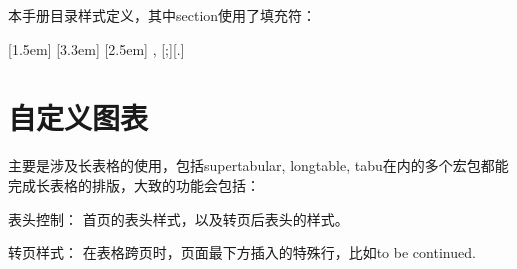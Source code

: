 本手册目录样式定义，其中section使用了填充符：
\begin{latex}{}
[1.5em]{}{\contentslabel{1.5em}}
    {\hspace*{-2em}}{\hfill\contentspage}
[3.3em]{}
    {\contentslabel{1.8em}}{\hspace*{-2.3em}}
    {\titlerule*[8pt]{$\cdot$}\contentspage}
[2.5em]{\small}
    {\thecontentslabel{}}{}
    {, \thecontentspage}[;\qquad][.]
\end{latex}

\section{自定义图表}
\label{sec:figtab}
主要是涉及长表格的使用，包括supertabular, longtable, tabu在内的多个宏包都能完成长表格的排版，大致的功能会包括：
\begin{para}
\item[表头控制：] 首页的表头样式，以及转页后表头的样式。
\item[转页样式：] 在表格跨页时，页面最下方插入的特殊行，比如to be continued.
\end{para}

